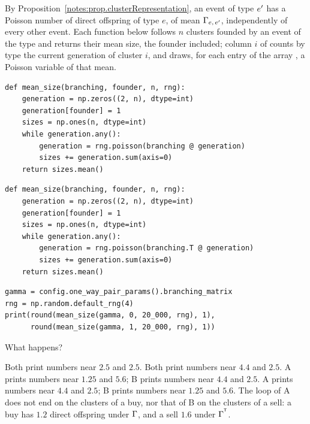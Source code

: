 \begin{question}
\label{question.clusterSizeByFounderAndItsTranspose}
By Proposition~\ref{notes:prop.clusterRepresentation},
an event of type $e^{\prime}$ has a Poisson number of direct offspring of type $e$,
of mean $\Gamma_{e,\, e^{\prime}}$, independently of every other event.
Each function below follows $n$ clusters founded by an event of the type 
and returns their mean size, the founder included;
column $i$ of  counts by type the current generation of cluster $i$,
and  draws, for each entry of the array ,
a Poisson variable of that mean.
\begin{lstlisting}[caption={Alternative A}, label=listing.clusterSizeByFounderAndItsTransposeA]
def mean_size(branching, founder, n, rng):
    generation = np.zeros((2, n), dtype=int)
    generation[founder] = 1
    sizes = np.ones(n, dtype=int)
    while generation.any():
        generation = rng.poisson(branching @ generation)
        sizes += generation.sum(axis=0)
    return sizes.mean()
\end{lstlisting}
\begin{lstlisting}[caption={Alternative B}, label=listing.clusterSizeByFounderAndItsTransposeB]
def mean_size(branching, founder, n, rng):
    generation = np.zeros((2, n), dtype=int)
    generation[founder] = 1
    sizes = np.ones(n, dtype=int)
    while generation.any():
        generation = rng.poisson(branching.T @ generation)
        sizes += generation.sum(axis=0)
    return sizes.mean()
\end{lstlisting}
\begin{lstlisting}[caption={Run once with each alternative, on the one-way pair}, label=listing.clusterSizeByFounderAndItsTransposeRun]
gamma = config.one_way_pair_params().branching_matrix
rng = np.random.default_rng(4)
print(round(mean_size(gamma, 0, 20_000, rng), 1),
      round(mean_size(gamma, 1, 20_000, rng), 1))
\end{lstlisting}
What happens?
\begin{choices}
 \choice Both print numbers near $2.5$ and $2.5$.
 \choice Both print numbers near $4.4$ and $2.5$.
 \choice A prints numbers near $1.25$ and $5.6$; B prints numbers near $4.4$ and $2.5$.
 \correctchoice A prints numbers near $4.4$ and $2.5$; B prints numbers near $1.25$ and $5.6$.
 \choice The loop of A does not end on the clusters of a buy,
  nor that of B on the clusters of a sell:
  a buy has $1.2$ direct offspring under $\Gamma$,
  and a sell $1.6$ under $\Gamma^{^{\mathsf{T}}}$.
\end{choices}
\end{question}


